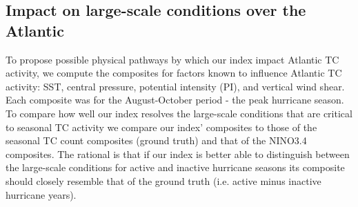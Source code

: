 \documentclass[]{article}
\begin{document}
% 


\subsection{Impact on large-scale conditions over the Atlantic}
To propose possible physical pathways by which our index impact Atlantic TC activity, we compute the composites for factors known to influence Atlantic TC activity: SST, central pressure, potential intensity (PI), and vertical wind shear. Each composite was for the August-October period - the peak hurricane season. To compare how well our index resolves the large-scale conditions that are critical to seasonal TC activity we compare our index' composites to those of the seasonal TC count composites (ground truth) and that of the NINO3.4 composites. The rational is that if our index is better able to distinguish between the large-scale conditions for active and inactive hurricane seasons its composite should closely resemble that of the ground truth (i.e. active minus inactive hurricane years).
\end{document}
